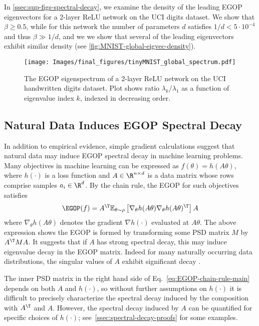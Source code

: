 \documentclass{article}
\begin{document}
     In \cref{ssec:sup-figs-spectral-decay}, we examine the density of the leading EGOP eigenvectors for a 2-layer ReLU network on the UCI digits dataset. We show that $\beta \geq 0.5$, while for this network the number of parameters $d$ satisfies $1/d < 5 \cdot 10^{-4}$ and thus  $\beta \gg1/d$, and we we show that several of the leading eigenvectors exhibit similar density (see \cref{fig:MNIST-global-eigvec-density}).

\begin{figure}[t!]    \centering\texttt{[image: Images/final\_figures/tinyMNIST\_global\_spectrum.pdf]}
    \caption{The EGOP eigenspectrum of a 2-layer ReLU network on the UCI handwritten digits dataset. Plot shows ratio $\lambda_k/\lambda_1$ as a function of eigenvalue index $k$, indexed in decreasing order.}
    \label{fig:tinyMNIST-global-spectral-decay}
\end{figure}
    
    \subsection{Natural Data Induces EGOP Spectral Decay}

    In addition to empirical evidence, simple gradient calculations suggest that natural data may induce EGOP spectral decay in machine learning problems. Many objectives in machine learning can be expressed as $f(\theta) = h(A\theta)$, where $h(\cdot)$ is a loss function and $A \in \R^{n\times d}$ is a data matrix whose rows comprise samples $a_i \in \R^d$. By the chain rule, the EGOP for such objectives satisfies
    \begin{equation}
        \label{eq:EGOP-chain-rule-main}
        \EGOP(f) = A^\T \mathbb{E}_{\theta\sim \rho}\left[\nabla_\theta h(A\theta) \nabla_\theta h(A\theta)^\T\right] A
    \end{equation}
    where $\nabla_{\theta}h(A\theta)$ denotes the gradient $\nabla h(\cdot)$ evaluated at $A\theta$. The above expression shows the EGOP is formed by transforming some PSD matrix $M$ by $A^\T M A$. It suggests that if $A$ has strong spectral decay, this may induce eigenvalue decay in the EGOP matrix. Indeed for many naturally occurring data distributions, the singular values of $A$ exhibit significant decay \cite{udell2019big}.
    
    The inner PSD matrix in the right hand side of Eq.~\ref{eq:EGOP-chain-rule-main} depends on both $A$ and $h(\cdot)$, so without further assumptions on $h(\cdot)$ it is difficult to precisely characterize the  spectral decay induced by the composition with $A^\T$ and $A$. However, the spectral decay induced by $A$ can be quantified for specific choices of $h(\cdot)$; see~\cref{ssec:spectral-decay-proofs} for some examples.
\end{document}
